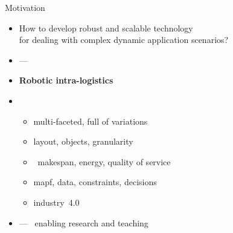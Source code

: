 \begin{frame}{Motivation}
  \medskip
  \begin{itemize}
  \item {}
    How to develop robust and scalable  technology
    \\
    for dealing with complex dynamic application scenarios?
    \medskip
  \item<3->  --- \ 

  \item<4->[]{\alert{\bf Robotic intra-logistics}} %
    \medskip

  \item<5-> 
    \begin{itemize}\normalsize
    \item {}        \hspace{33pt}  multi-faceted, full of variations
    \item {}    \hspace{15pt}  layout, objects, granularity
    \item {}  \              makespan, energy, quality of service
    \item {} \hspace{3pt} mapf, data, constraints, decisions
    \item {}    \hspace{15pt}  industry~4.0
    \end{itemize}
    \smallskip
  \item<6->  --- \ enabling research and teaching
  \end{itemize}
\end{frame}
